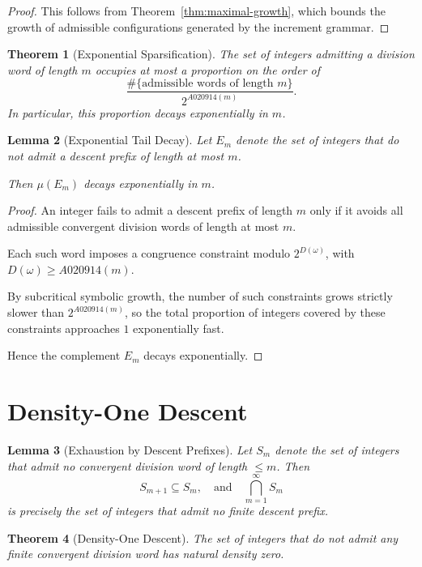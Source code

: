 \documentclass[12pt, oneside]{article}
\numberwithin{equation}{section}
\theoremstyle{definition}
\theoremstyle{plain}
\newtheorem{theorem}{Theorem}[section]
\newtheorem{lemma}[theorem]{Lemma}
\theoremstyle{remark}
\begin{document}
\begin{proof}
This follows from Theorem~\ref{thm:maximal-growth}, which bounds the growth
of admissible configurations generated by the increment grammar.
\end{proof}

\begin{theorem}[Exponential Sparsification]
The set of integers admitting a division word of length $m$ occupies at most
a proportion on the order of
\[
\frac{\#\{\text{admissible words of length } m\}}{2^{A020914(m)}}.
\]
In particular, this proportion decays exponentially in $m$.
\end{theorem}

\begin{lemma}[Exponential Tail Decay]
Let $E_m$ denote the set of integers that do not admit a descent prefix
of length at most $m$.

Then $\mu(E_m)$ decays exponentially in $m$.
\end{lemma}

\begin{proof}
An integer fails to admit a descent prefix of length $m$ only if it avoids
all admissible convergent division words of length at most $m$.

Each such word imposes a congruence constraint modulo $2^{D(\omega)}$,
with $D(\omega) \ge A020914(m)$.

By subcritical symbolic growth, the number of such constraints grows
strictly slower than $2^{A020914(m)}$, so the total proportion of integers
covered by these constraints approaches $1$ exponentially fast.

Hence the complement $E_m$ decays exponentially.
\end{proof}

\section{Density-One Descent}
\label{sec:density-one-descent}

\begin{lemma}[Exhaustion by Descent Prefixes]
Let $S_m$ denote the set of integers that admit no convergent division word
of length $\le m$. Then
\[
S_{m+1} \subseteq S_m,
\quad\text{and}\quad
\bigcap_{m=1}^\infty S_m
\]
is precisely the set of integers that admit no finite descent prefix.
\end{lemma}

\begin{theorem}[Density-One Descent]
The set of integers that do not admit any finite convergent division word
has natural density zero.
\end{theorem}
\end{document}
